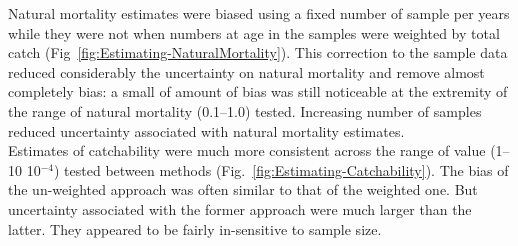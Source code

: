 Natural mortality estimates were biased using a fixed number of sample per years while they were not when numbers at age in the samples were weighted by total catch (Fig~\ref{fig:Estimating-NaturalMortality}). This correction to the sample data reduced considerably the uncertainty on natural mortality and remove almost completely bias: a small of amount of bias was still noticeable at the extremity of the range of natural mortality (0.1--1.0) tested. Increasing number of samples reduced uncertainty associated with natural mortality estimates. \\ 

Estimates of catchability were much more consistent across the range of value (1--10 10$^{-4}$) tested between methods (Fig.~\ref{fig:Estimating-Catchability}). The bias of the un-weighted approach was often similar to that of the weighted one. But uncertainty associated with the former approach were much larger than the latter. They appeared to be fairly in-sensitive to sample size. \\

